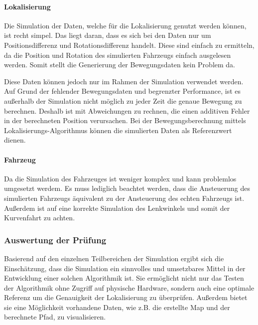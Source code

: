 \paragraph{Lokalisierung}
Die Simulation der Daten, welche für die Lokalisierung genutzt werden können, ist recht simpel.
Das liegt daran, dass es sich bei den Daten nur um Positionsdifferenz und Rotationsdifferenz handelt.
Diese sind einfach zu ermitteln, da die Position und Rotation des simulierten Fahrzeugs einfach ausgelesen werden.
Somit stellt die Generierung der Bewegungsdaten kein Problem da.

Diese Daten können jedoch nur im Rahmen der Simulation verwendet werden.
Auf Grund der fehlender Bewegungsdaten und begrenzter Performance, ist es außerhalb der Simulation nicht möglich zu jeder Zeit die genaue Bewegung zu berechnen. 
Deshalb ist mit Abweichungen zu rechnen, die einen additiven Fehler in der berechneten Position verursachen.
Bei der Bewegungsberechnung mittels Lokalisierungs-Algorithmus können die simulierten Daten als Referenzwert dienen.

\paragraph{Fahrzeug}
Da die Simulation des Fahrzeuges ist weniger komplex und kann problemlos umgesetzt werdem.
Es muss lediglich beachtet werden, dass die Ansteuerung des simulierten Fahrzeugs äquivalent zu der Ansteuerung des echten Fahrzeugs ist.
Außerdem ist auf eine korrekte Simulation des Lenkwinkels und somit der Kurvenfahrt zu achten.

\subsubsection{Auswertung der Prüfung}
Basierend auf den einzelnen Teilbereichen der Simulation ergibt sich die Einschätzung, 
dass die Simulation ein sinnvolles und umsetzbares Mittel in der Entwicklung einer solchen Algorithmik ist.
Sie ermöglicht nicht nur das Testen der Algorithmik ohne Zugriff auf physische Hardware, 
sondern auch eine optimale Referenz um die Genauigkeit der Lokalisierung zu überprüfen.
Außerdem bietet sie eine Möglichkeit vorhandene Daten, wie z.B. die erstellte Map und der berechnete Pfad, zu visualisieren.
  
\newpage
